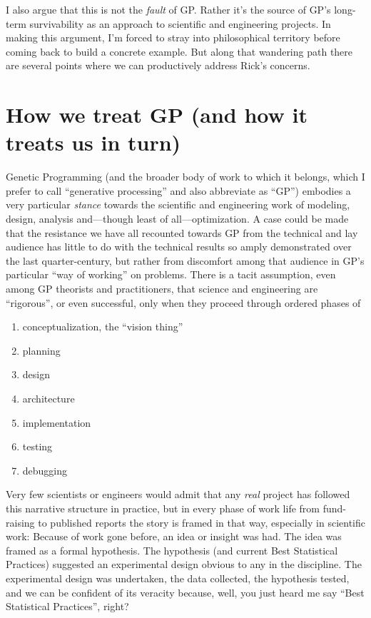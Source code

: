 I also argue that this is not the \emph{fault} of GP. Rather it's the source of GP's long-term survivability as an approach to scientific and engineering projects. In making this argument, I'm forced to stray into philosophical territory before coming back to build a concrete example. But along that wandering path there are several points where we can productively address Rick's concerns.

\section{How we treat GP (and how it treats us in turn)}\hypertarget{how-we-treat-gp-and-how-it-treats-us-in-turn}{}\label{how-we-treat-gp-and-how-it-treats-us-in-turn}

Genetic Programming (and the broader body of work to which it belongs, which I prefer to call ``generative processing'' and also abbreviate as ``GP'') embodies a very particular \emph{stance} towards the scientific and engineering work of modeling, design, analysis and---though least of all---optimization. A case could be made that the resistance we have all recounted towards GP from the technical and lay audience has little to do with the technical results so amply demonstrated over the last quarter-century, but rather from discomfort among that audience in GP's particular ``way of working'' on problems. There is a tacit assumption, even among GP theorists and practitioners, that science and engineering are ``rigorous'', or even successful, only when they proceed through ordered phases of

\begin{enumerate}
\item conceptualization, the ``vision thing''
\item planning
\item design
\item architecture
\item implementation
\item testing
\item debugging
\end{enumerate}

Very few scientists or engineers would admit that any \emph{real} project has followed this narrative structure in practice, but in every phase of work life from fund-raising to published reports the story is framed in that way, especially in scientific work: Because of work gone before, an idea or insight was had. The idea was framed as a formal hypothesis. The hypothesis (and current Best Statistical Practices) suggested an experimental design obvious to any in the discipline. The experimental design was undertaken, the data collected, the hypothesis tested, and we can be confident of its veracity because, well, you just heard me say ``Best Statistical Practices'', right?

